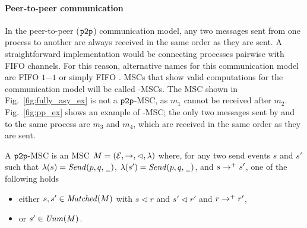 \paragraph{\bf  Peer-to-peer communication}
In the peer-to-peer ($\mathtt{p2p}$) communication model, any two messages sent from one process to another  are always received in the same order as they are sent. A straightforward implementation would be connecting processes pairwise with FIFO channels. %
For this reason, alternative names for this communication model are FIFO $1\mathsf{-}1$ \cite{DBLP:journals/fac/ChevrouHQ16} or simply FIFO \cite{babaoglu1993consistent, DBLP:journals/dc/Charron-BostMT96, tel2000introduction}.
MSCs that show valid computations for the \pp communication model will be called \pp-MSCs.
The MSC shown in Fig.~\ref{fig:fully_asy_ex} is not a $\mathtt{p2p}$-MSC, as $m_1$ cannot be received after $m_2$.
Fig.~\ref{fig:pp_ex} shows an example of \pp-MSC; the only two messages sent by and to the same process are $m_3$ and $m_4$, which are received in the same order as they are sent. %

\begin{definition}\label{def:pp_msc}
	A $\mathtt{p2p}$-MSC is an MSC $M = (\mathcal{E},\to,\lhd,\lambda)$ where, for any two send events $s$ and $s'$ such that $\lambda(s)={\mathit{Send}(p,q,\hspace{0.1em}\underline{\hspace{0.5em}}\hspace{0.1em})}$, $\lambda(s')={\mathit{Send}(p,q,\hspace{0.1em}\underline{\hspace{0.5em}}\hspace{0.1em})}$, and $s \to^+ s'$, one of the following holds
	\begin{itemize}%
		\item either $s,s' \in \mathit{Matched}(M)$ with $s \lhd r$ and $s' \lhd r'$ and $r \to^+ r'$,  %
		\item or $s' \in \mathit{Unm}(M)$.
	\end{itemize}
	
\end{definition}

